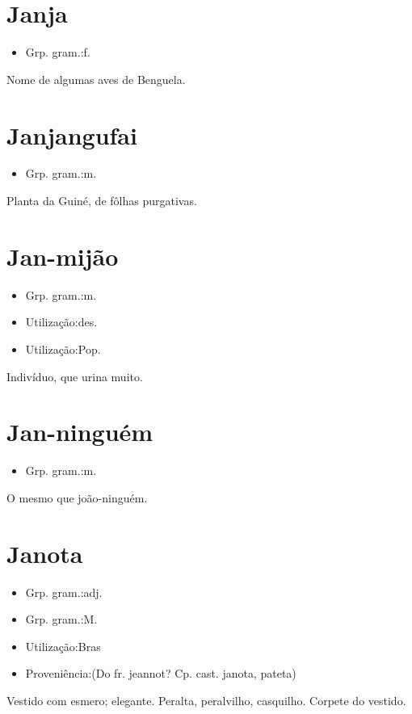 \documentclass{article}
\begin{document}
\section{Janja}
\begin{itemize}
\item {Grp. gram.:f.}
\end{itemize}
Nome de algumas aves de Benguela.
\section{Janjangufai}
\begin{itemize}
\item {Grp. gram.:m.}
\end{itemize}
Planta da Guiné, de fôlhas purgativas.
\section{Jan-mijão}
\begin{itemize}
\item {Grp. gram.:m.}
\end{itemize}
\begin{itemize}
\item {Utilização:des.}
\end{itemize}
\begin{itemize}
\item {Utilização:Pop.}
\end{itemize}
Indivíduo, que urina muito.
\section{Jan-ninguém}
\begin{itemize}
\item {Grp. gram.:m.}
\end{itemize}
O mesmo que \textunderscore joão-ninguém\textunderscore .
\section{Janota}
\begin{itemize}
\item {Grp. gram.:adj.}
\end{itemize}
\begin{itemize}
\item {Grp. gram.:M.}
\end{itemize}
\begin{itemize}
\item {Utilização:Bras}
\end{itemize}
\begin{itemize}
\item {Proveniência:(Do fr. \textunderscore jeannot\textunderscore ? Cp. cast. \textunderscore janota\textunderscore , pateta)}
\end{itemize}
Vestido com esmero; elegante.
Peralta, peralvilho, casquilho.
Corpete do vestido.
\end{document}
